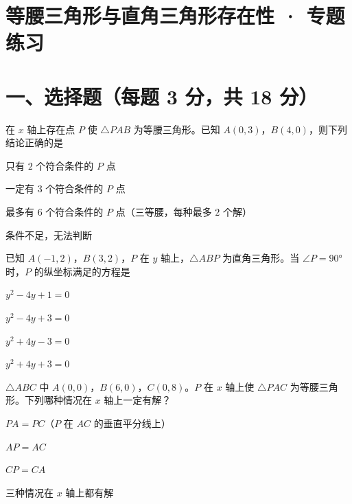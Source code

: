 \documentclass{exam-zh}
\begin{document}
\section*{等腰三角形与直角三角形存在性 · 专题练习}

\section*{一、选择题（每题 3 分，共 18 分）}


\begin{question}[points=3]
  在 $x$ 轴上存在点 $P$ 使 $\triangle PAB$ 为等腰三角形。已知 $A(0,3)$，$B(4,0)$，则下列结论正确的是
  \begin{choices}
    \item 只有 $2$ 个符合条件的 $P$ 点
    \item 一定有 $3$ 个符合条件的 $P$ 点
    \item 最多有 $6$ 个符合条件的 $P$ 点（三等腰，每种最多 $2$ 个解）
    \item 条件不足，无法判断
  \end{choices}
\end{question}



\begin{question}[points=3]
  已知 $A(-1,2)$，$B(3,2)$，$P$ 在 $y$ 轴上，$\triangle ABP$ 为直角三角形。当 $\angle P = 90°$ 时，$P$ 的纵坐标满足的方程是
  \begin{choices}
    \item $y^2 - 4y + 1 = 0$
    \item $y^2 - 4y + 3 = 0$
    \item $y^2 + 4y - 3 = 0$
    \item $y^2 + 4y + 3 = 0$
  \end{choices}
\end{question}



\begin{question}[points=3]
  $\triangle ABC$ 中 $A(0,0)$，$B(6,0)$，$C(0,8)$。$P$ 在 $x$ 轴上使 $\triangle PAC$ 为等腰三角形。下列哪种情况在 $x$ 轴上一定有解？
  \begin{choices}
    \item $PA = PC$（$P$ 在 $AC$ 的垂直平分线上）
    \item $AP = AC$
    \item $CP = CA$
    \item 三种情况在 $x$ 轴上都有解
  \end{choices}
\end{question}
\end{document}
